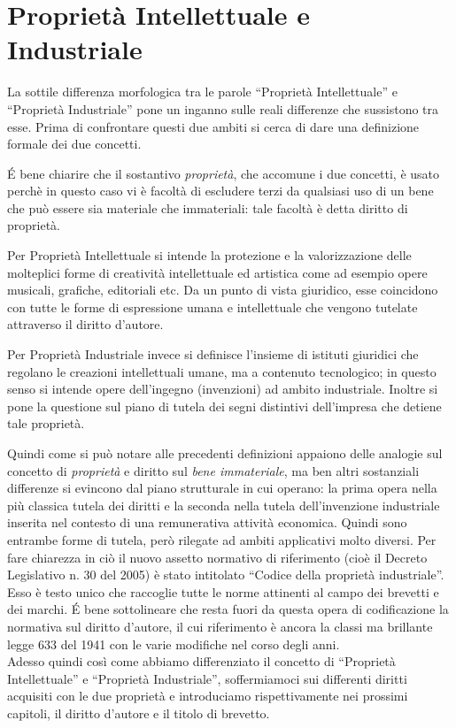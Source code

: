 \chapter{Proprietà Intellettuale e Industriale}
La sottile differenza morfologica tra le parole ``Proprietà Intellettuale'' e ``Proprietà Industriale'' pone un inganno sulle reali differenze che sussistono tra esse. Prima di confrontare questi due ambiti si cerca di dare una definizione formale dei due concetti.

\'E bene chiarire che il sostantivo \textit{proprietà}, che accomune i due concetti, è usato perchè in questo caso vi è facoltà di escludere terzi da qualsiasi uso di un bene che può essere sia materiale che immateriali: tale facoltà è detta diritto di proprietà.

Per Proprietà Intellettuale si intende la protezione e la valorizzazione delle molteplici forme di creatività intellettuale ed artistica come ad esempio opere musicali, grafiche, editoriali etc. Da un punto di vista giuridico, esse coincidono con tutte le forme di espressione umana e intellettuale che vengono tutelate attraverso il diritto d'autore.

Per Proprietà Industriale invece si definisce l'insieme di istituti giuridici che regolano le creazioni intellettuali umane, ma a contenuto tecnologico; in questo senso si intende opere dell'ingegno (invenzioni) ad ambito industriale. Inoltre si pone la questione sul piano di tutela dei segni distintivi dell'impresa che detiene tale proprietà.

Quindi come si può notare alle precedenti definizioni appaiono delle analogie sul concetto di \textit{proprietà} e diritto sul \textit{bene immateriale}, ma ben altri sostanziali differenze si evincono dal piano strutturale in cui operano: la prima opera nella più classica tutela dei diritti e la seconda nella tutela dell'invenzione industriale inserita nel contesto di una remunerativa attività economica. Quindi sono entrambe forme di tutela, però rilegate ad ambiti applicativi molto diversi. Per fare chiarezza in ciò il nuovo assetto normativo di riferimento (cioè il Decreto Legislativo n. 30 del 2005) è stato intitolato “Codice della proprietà industriale”. Esso è testo unico che raccoglie tutte le norme attinenti al campo dei brevetti e dei marchi. \'E bene sottolineare che resta fuori da questa opera di codificazione la normativa sul diritto d'autore, il cui riferimento è ancora la classi ma brillante legge 633 del 1941 con le varie modifiche nel corso degli anni. \\
Adesso quindi così come abbiamo differenziato il concetto di ``Proprietà Intellettuale'' e ``Proprietà Industriale'', soffermiamoci sui differenti diritti acquisiti con le due proprietà e introduciamo rispettivamente nei prossimi capitoli, il diritto d'autore e il titolo di brevetto.

